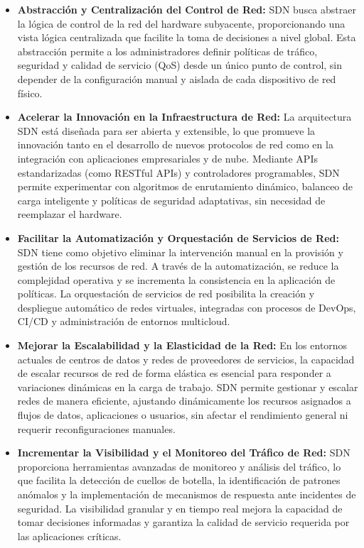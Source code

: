 {        \begin{itemize}        
            \item \textbf{Abstracción y Centralización del Control de Red:} SDN busca abstraer la lógica de control de la red del hardware subyacente, proporcionando una vista lógica centralizada que facilite la toma de decisiones a nivel global. Esta abstracción permite a los administradores definir políticas de tráfico, seguridad y calidad de servicio (QoS) desde un único punto de control, sin depender de la configuración manual y aislada de cada dispositivo de red físico.
            \item \textbf{Acelerar la Innovación en la Infraestructura de Red:} La arquitectura SDN está diseñada para ser abierta y extensible, lo que promueve la innovación tanto en el desarrollo de nuevos protocolos de red como en la integración con aplicaciones empresariales y de nube. Mediante APIs estandarizadas (como RESTful APIs) y controladores programables, SDN permite experimentar con algoritmos de enrutamiento dinámico, balanceo de carga inteligente y políticas de seguridad adaptativas, sin necesidad de reemplazar el hardware.
            \item \textbf{Facilitar la Automatización y Orquestación de Servicios de Red:} SDN tiene como objetivo eliminar la intervención manual en la provisión y gestión de los recursos de red. A través de la automatización, se reduce la complejidad operativa y se incrementa la consistencia en la aplicación de políticas. La orquestación de servicios de red posibilita la creación y despliegue automático de redes virtuales, integradas con procesos de DevOps, CI/CD y administración de entornos multicloud.
            \item \textbf{Mejorar la Escalabilidad y la Elasticidad de la Red:} En los entornos actuales de centros de datos y redes de proveedores de servicios, la capacidad de escalar recursos de red de forma elástica es esencial para responder a variaciones dinámicas en la carga de trabajo. SDN permite gestionar y escalar redes de manera eficiente, ajustando dinámicamente los recursos asignados a flujos de datos, aplicaciones o usuarios, sin afectar el rendimiento general ni requerir reconfiguraciones manuales.
            \item \textbf{Incrementar la Visibilidad y el Monitoreo del Tráfico de Red:} SDN proporciona herramientas avanzadas de monitoreo y análisis del tráfico, lo que facilita la detección de cuellos de botella, la identificación de patrones anómalos y la implementación de mecanismos de respuesta ante incidentes de seguridad. La visibilidad granular y en tiempo real mejora la capacidad de tomar decisiones informadas y garantiza la calidad de servicio requerida por las aplicaciones críticas.

\end{itemize}}
